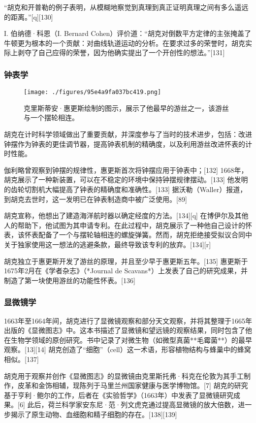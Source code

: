 “胡克和开普勒的例子表明，从模糊地察觉到真理到真正证明真理之间有多么遥远的距离。”[q][130]

I. 伯纳德·科恩（I. Bernard Cohen）评价道：“胡克对倒数平方定律的主张掩盖了牛顿更为根本的一个贡献：对曲线轨道运动的分析。在要求过多的荣誉时，胡克实际上剥夺了自己应得的荣誉，因为他确实提出了一个开创性的想法。”[131]
\subsubsection{钟表学}
\begin{figure}[ht]
\centering
\texttt{[image: ./figures/95e4a9fa037bc419.png]}
\caption{克里斯蒂安·惠更斯绘制的图示，展示了他最早的游丝之一，该游丝与一个摆轮相连。} \label{fig_HK_6}
\end{figure}
胡克在计时科学领域做出了重要贡献，并深度参与了当时的技术进步，包括：改进钟摆作为钟表的更佳调节器，提高钟表机制的精确度，以及利用游丝改进怀表的计时性能。

伽利略曾观察到钟摆的规律性，惠更斯首次将钟摆应用于钟表中；[132] 1668年，胡克展示了一种新装置，可以在不稳定的环境中保持钟摆规律摆动。[133] 他发明的齿轮切割机大幅提高了钟表的精确度和准确性。[133] 据沃勒（Waller）报道，到胡克去世时，这一发明已在钟表制造商中被广泛使用。[89]

胡克宣称，他想出了建造海洋航时器以确定经度的方法。[134][q] 在博伊尔及其他人的帮助下，他试图为其申请专利。在此过程中，胡克展示了一种他自己设计的怀表，该怀表配备了一个与摆轮轴相连的螺旋弹簧。然而，胡克拒绝接受拟议合同中关于独家使用这一想法的逃避条款，最终导致该专利的放弃。[134][r]

胡克独立于惠更斯开发了游丝的原理，并且至少早于惠更斯五年。[135] 惠更斯于1675年2月在《学者杂志》（*Journal de Scavans*）上发表了自己的研究成果，并制造了第一块使用游丝的功能性怀表。[136]
\subsubsection{显微镜学} 
1663年至1664年间，胡克进行了显微镜观察和部分天文观察，并将其整理于1665年出版的《显微图志》中。这本书描述了显微镜和望远镜的观察结果，同时包含了他在生物学领域的原创研究。书中记录了对微生物（如微型真菌**毛霉菌**）的最早观察。[13][14] 胡克创造了“细胞”（cell）这一术语，形容植物结构与蜂巢中的蜂窝相似。[137]  

胡克用于观察并创作《显微图志》的显微镜由克里斯托弗·科克在伦敦为其手工制作，皮革和金饰相辅，现陈列于马里兰州国家健康与医学博物馆。[7] 胡克的研究基于亨利·鲍尔的工作，后者在《实验哲学》（1663年）中发表了显微镜研究成果。[6] 此后，荷兰科学家安东尼·范·列文虎克通过提高显微镜的放大倍数，进一步揭示了原生动物、血细胞和精子细胞的存在。[138][139]  

